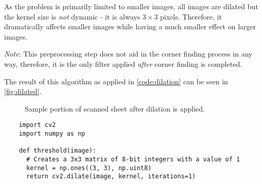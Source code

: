 \documentclass[12pt, letterpaper]{report}
\newcommand*{\itemref}[1]{\hypersetup{linkcolor=usfgreen}\hyperref[{#1}]{\autoref*{#1}}}
\newcommand*{\boxedimage}[1]{\fbox{\texttt{[image: img/\#1]}}}
\newcommand{\fig}[3]{
  \begin{figure}[h]
    \caption{#1}
    \label{#3}
    \centering
    \boxedimage{#2}
  \end{figure}
}
\begin{document}
As the problem is primarily limited to smaller images, all images are dilated
but the kernel size is \textit{not} dynamic - it is always $3\times3$ pixels.
Therefore, it dramatically affects smaller images while having a much smaller
effect on larger images.

\textit{Note}: This preprocessing step does not aid in the corner finding
process in any way, therefore, it is the only filter applied \textit{after}
corner finding is completed.

The result of this algorithm as applied in \itemref{code:dilation} can be seen
in \itemref{fig:dilated}.

\fig{Sample portion of scanned sheet after dilation is applied.}{sample/dilated.jpg}{fig:dilated}

\begin{codesample}[h]
  \caption{Simple dilation of an input image.}
  \label{code:dilation}
  \begin{verbatim}
    import cv2
    import numpy as np

    def threshold(image):
      # Creates a 3x3 matrix of 8-bit integers with a value of 1
      kernel = np.ones((3, 3), np.uint8)
      return cv2.dilate(image, kernel, iterations=1)
  \end{verbatim}
\end{codesample}
\label{sect:reading}
\end{document}
